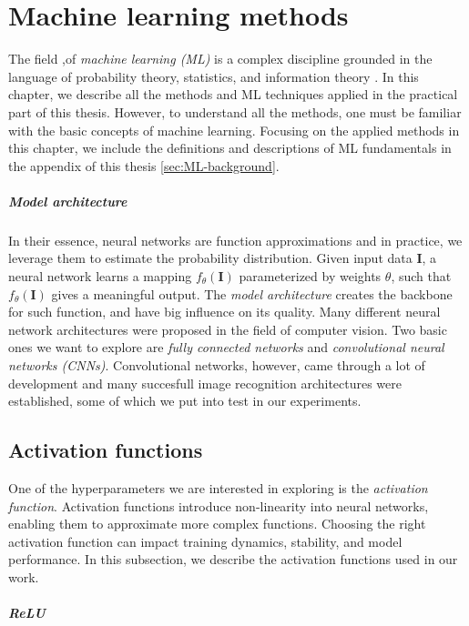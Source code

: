 \chapter{Machine learning methods}
\label{chap2}

The field ,of \emph{machine learning (ML)} is a complex discipline grounded in the language of probability theory, statistics, and information theory \cite{bengio2017deep}. In this chapter, we describe all the methods and ML techniques applied in the practical part of this thesis. However, to understand all the methods, one must be familiar with the basic concepts of machine learning. Focusing on the applied methods in this chapter, we include the definitions and descriptions of ML fundamentals in the appendix of this thesis \ref{sec:ML-background}.

\paragraph{Model architecture} 
In their essence, neural networks are function approximations and in practice, we leverage them to estimate the probability distribution. Given input data $\bm{I}$, a neural network learns a mapping $f_\theta(\bm{I})$ parameterized by weights $\theta$, such that $f_\theta(\bm{I})$ gives a meaningful output. The \emph{model architecture} creates the backbone for such function, and have big influence on its quality. Many different neural network architectures were proposed in the field of computer vision. Two basic ones we want to explore are \emph{fully connected networks} and \emph{convolutional neural networks (CNNs)}. Convolutional networks, however, came through a lot of development and many succesfull image recognition architectures were established, some of which we put into test in our experiments.


\section{Activation functions}
\label{sec:activation}

One of the hyperparameters we are interested in exploring is the \emph{activation function}. Activation functions introduce non-linearity into neural networks, enabling them to approximate more complex functions. Choosing the right activation function can impact training dynamics, stability, and model performance. In this subsection, we describe the activation functions used in our work.

\paragraph{ReLU}

